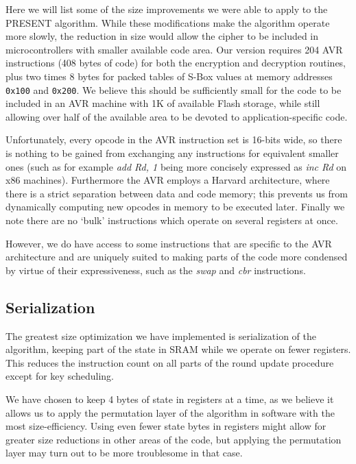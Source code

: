 \documentclass[11pt]{article}
\begin{document}
Here we will list some of the size improvements we were able to apply to the PRESENT algorithm.
While these modifications make the algorithm operate more slowly, the reduction in size would allow the cipher to be included in microcontrollers with smaller available code area.
Our version requires 204 AVR instructions (408 bytes of code) for both the encryption and decryption routines, plus two times 8 bytes for packed tables of S-Box values at memory addresses \texttt{0x100} and \texttt{0x200}.
We believe this should be sufficiently small for the code to be included in an AVR machine with 1K of available Flash storage, while still allowing over half of the available area to be devoted to application-specific code.

Unfortunately, every opcode in the AVR instruction set is 16-bits wide, so there is nothing to be gained from exchanging any instructions for equivalent smaller ones (such as for example \textit{add Rd, 1} being more concisely expressed as \textit{inc Rd} on x86 machines).
Furthermore the AVR employs a Harvard architecture, where there is a strict separation between data and code memory; this prevents us from dynamically computing new opcodes in memory to be executed later.
Finally we note there are no `bulk' instructions which operate on several registers at once.

However, we do have access to some instructions that are specific to the AVR architecture and are uniquely suited to making parts of the code more condensed by virtue of their expressiveness, such as the \textit{swap} and \textit{cbr} instructions.

\subsection{Serialization}
The greatest size optimization we have implemented is serialization of the algorithm, keeping part of the state in SRAM while we operate on fewer registers.
This reduces the instruction count on all parts of the round update procedure except for key scheduling.

We have chosen to keep 4 bytes of state in registers at a time, as we believe it allows us to apply the permutation layer of the algorithm in software with the most size-efficiency.
Using even fewer state bytes in registers might allow for greater size reductions in other areas of the code, but applying the permutation layer may turn out to be more troublesome in that case.
\end{document}

